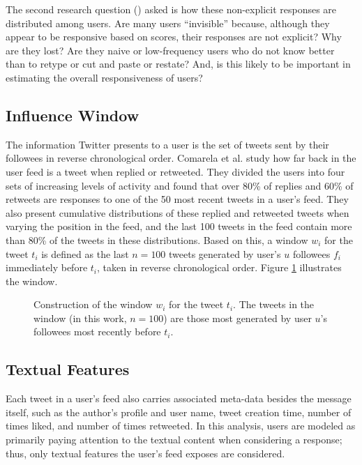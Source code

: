 The second research question (\ResearchQuestion\label{rq:usersDistribution}) asked is how these non-explicit responses are distributed among users.  Are many users ``invisible'' because, although they appear to be responsive based on scores, their responses are not explicit?  Why are they lost?  Are they naive or low-frequency users who do not know better than to retype or cut and paste or restate? And, is this likely to be important in estimating the overall responsiveness of users?

\subsection{Influence Window}

The information Twitter presents to a user is the set of tweets sent by their followees in reverse chronological order. Comarela et al. \cite{Comarela2012} study how far back in the user feed is a tweet when replied or retweeted. They divided the users into four sets of increasing levels of activity and found that over 80\% of replies and 60\% of retweets are responses to one of the 50 most recent tweets in a user's feed. They also present cumulative distributions of these replied and retweeted tweets when varying the position in the feed, and the last 100 tweets in the feed contain more than 80\% of the tweets in these distributions.  
Based on this, a window $w_i$ for the tweet $t_i$ is defined as the last $n=100$ tweets generated by user's $u$ followees $f_i$ immediately before $t_i$, taken in reverse chronological order.
Figure \ref{fig:fig_window_explanation} illustrates the window. 

\begin{figure}[!htbp]
\centering
\fontsize{9pt}{10pt}\selectfont

\caption{Construction of the window $w_i$ for the tweet $t_i$. The tweets in the window (in this work, $n=100$) are those most generated by user $u$'s followees most recently before $t_i$.} \label{fig:fig_window_explanation}
\end{figure}

\subsection{Textual Features}

Each tweet in a user's feed also carries associated meta-data besides the message itself, such as the author's profile and user name, tweet creation time, number of times liked, and number of times retweeted. In this analysis, users are modeled as primarily paying attention to the textual content when considering a response; thus, only textual features the user's feed exposes are considered.  

